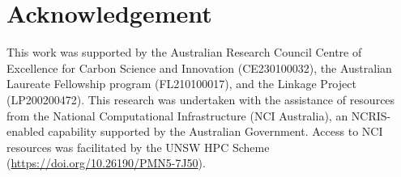 \documentclass[twoside,twocolumn,9pt]{article}
\begin{document}
\section*{Acknowledgement}
This work was supported by the Australian Research Council Centre of Excellence for Carbon Science and Innovation (CE230100032), the Australian Laureate Fellowship program (FL210100017), and the Linkage Project (LP200200472). 
This research was undertaken with the assistance of resources from the National Computational Infrastructure (NCI Australia), an NCRIS-enabled capability supported by the Australian Government.
Access to NCI resources was facilitated by the UNSW HPC Scheme (\url{https://doi.org/10.26190/PMN5-7J50}). 


 
\end{document}
